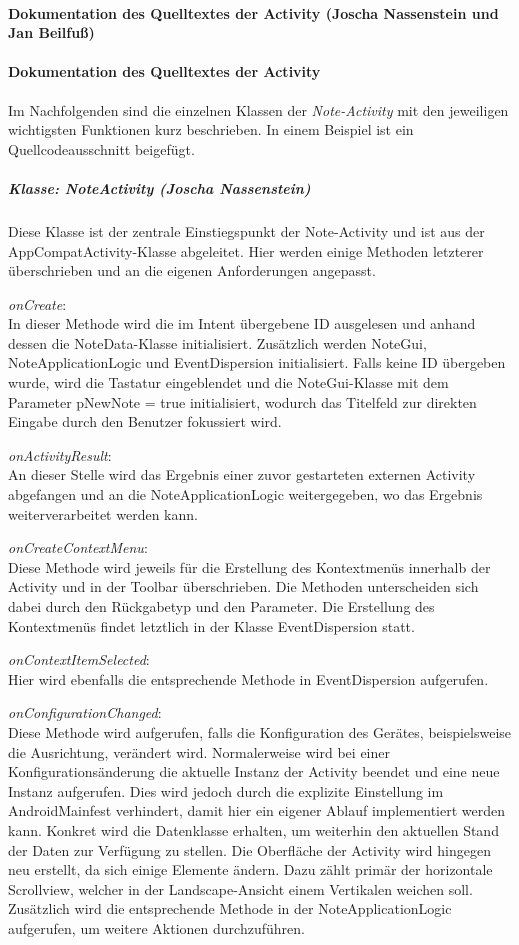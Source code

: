 \paragraph{Dokumentation des Quelltextes der Activity (Joscha Nassenstein und Jan Beilfuß)}
\paragraph{Dokumentation des Quelltextes der Activity}
Im Nachfolgenden sind die einzelnen Klassen der \textit{Note-Activity} mit den jeweiligen wichtigsten Funktionen kurz beschrieben. In einem Beispiel ist ein Quellcodeausschnitt beigefügt.
\subparagraph{Klasse: NoteActivity (Joscha Nassenstein)}
Diese Klasse ist der zentrale Einstiegspunkt der Note-Activity und ist aus der AppCompatActivity-Klasse abgeleitet. Hier werden einige Methoden letzterer überschrieben und an die eigenen Anforderungen angepasst.

\textit{onCreate}:\\
In dieser Methode wird die im Intent übergebene ID ausgelesen und anhand dessen die NoteData-Klasse initialisiert. Zusätzlich werden NoteGui, NoteApplicationLogic und EventDispersion initialisiert. Falls keine ID übergeben wurde, wird die Tastatur eingeblendet und die NoteGui-Klasse mit dem Parameter pNewNote = true initialisiert, wodurch das Titelfeld zur direkten Eingabe durch den Benutzer fokussiert wird.

\textit{onActivityResult}:\\
An dieser Stelle wird das Ergebnis einer zuvor gestarteten externen Activity abgefangen und an die NoteApplicationLogic weitergegeben, wo das Ergebnis weiterverarbeitet werden kann.

\textit{onCreateContextMenu}:\\
Diese Methode wird jeweils für die Erstellung des Kontextmenüs innerhalb der Activity und in der Toolbar überschrieben. Die Methoden unterscheiden sich dabei durch den Rückgabetyp und den Parameter. Die Erstellung des Kontextmenüs findet letztlich in der Klasse EventDispersion statt.

\textit{onContextItemSelected}:\\
Hier wird ebenfalls die entsprechende Methode in EventDispersion aufgerufen.

\textit{onConfigurationChanged}:\\
Diese Methode wird aufgerufen, falls die Konfiguration des Gerätes, beispielsweise die Ausrichtung, verändert wird. Normalerweise wird bei einer Konfigurationsänderung die aktuelle Instanz der Activity beendet und eine neue Instanz aufgerufen. Dies wird jedoch durch die explizite  Einstellung im AndroidMainfest verhindert, damit hier ein eigener Ablauf implementiert werden kann. Konkret wird die Datenklasse erhalten, um weiterhin den aktuellen Stand der Daten zur Verfügung zu stellen. Die Oberfläche der Activity wird hingegen neu erstellt, da sich einige Elemente ändern. Dazu zählt primär der horizontale Scrollview, welcher in der Landscape-Ansicht einem Vertikalen weichen soll. Zusätzlich wird die entsprechende Methode in der NoteApplicationLogic aufgerufen, um weitere Aktionen durchzuführen.


